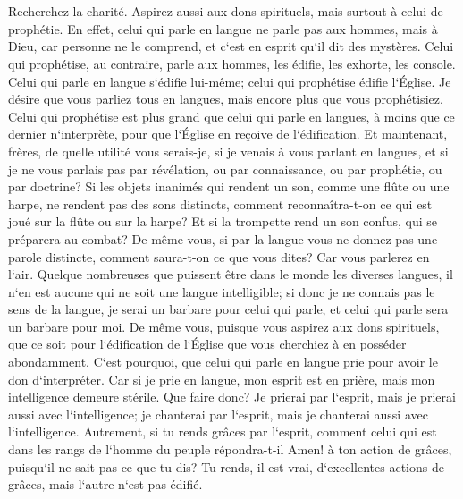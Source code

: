 \chapter{}

\verse Recherchez la charité. Aspirez aussi aux dons spirituels, mais surtout à celui de prophétie. 
\verse En effet, celui qui parle en langue ne parle pas aux hommes, mais à Dieu, car personne ne le comprend, et c`est en esprit qu`il dit des mystères. 
\verse Celui qui prophétise, au contraire, parle aux hommes, les édifie, les exhorte, les console. 
\verse Celui qui parle en langue s`édifie lui-même; celui qui prophétise édifie l`Église. 
\verse Je désire que vous parliez tous en langues, mais encore plus que vous prophétisiez. Celui qui prophétise est plus grand que celui qui parle en langues, à moins que ce dernier n`interprète, pour que l`Église en reçoive de l`édification. 
\verse Et maintenant, frères, de quelle utilité vous serais-je, si je venais à vous parlant en langues, et si je ne vous parlais pas par révélation, ou par connaissance, ou par prophétie, ou par doctrine? 
\verse Si les objets inanimés qui rendent un son, comme une flûte ou une harpe, ne rendent pas des sons distincts, comment reconnaîtra-t-on ce qui est joué sur la flûte ou sur la harpe? 
\verse Et si la trompette rend un son confus, qui se préparera au combat? 
\verse De même vous, si par la langue vous ne donnez pas une parole distincte, comment saura-t-on ce que vous dites? Car vous parlerez en l`air. 
\verse Quelque nombreuses que puissent être dans le monde les diverses langues, il n`en est aucune qui ne soit une langue intelligible; 
\verse si donc je ne connais pas le sens de la langue, je serai un barbare pour celui qui parle, et celui qui parle sera un barbare pour moi. 
\verse De même vous, puisque vous aspirez aux dons spirituels, que ce soit pour l`édification de l`Église que vous cherchiez à en posséder abondamment. 
\verse C`est pourquoi, que celui qui parle en langue prie pour avoir le don d`interpréter. 
\verse Car si je prie en langue, mon esprit est en prière, mais mon intelligence demeure stérile. 
\verse Que faire donc? Je prierai par l`esprit, mais je prierai aussi avec l`intelligence; je chanterai par l`esprit, mais je chanterai aussi avec l`intelligence. 
\verse Autrement, si tu rends grâces par l`esprit, comment celui qui est dans les rangs de l`homme du peuple répondra-t-il Amen! à ton action de grâces, puisqu`il ne sait pas ce que tu dis? 
\verse Tu rends, il est vrai, d`excellentes actions de grâces, mais l`autre n`est pas édifié. 
